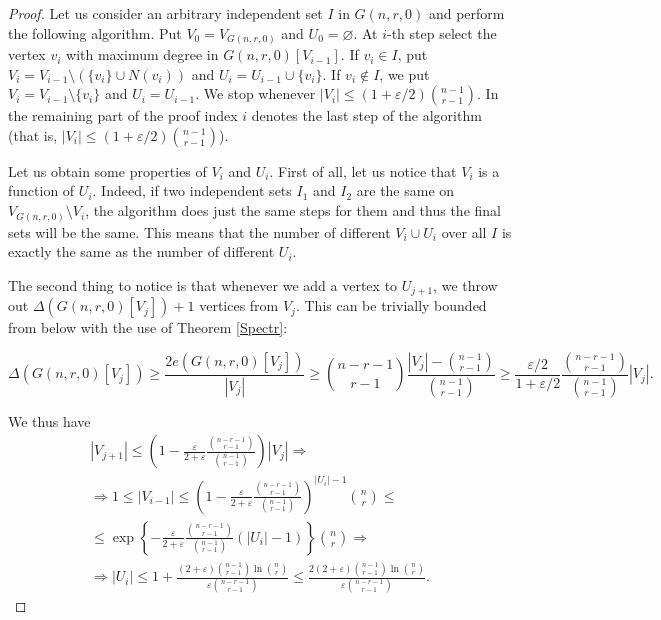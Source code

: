 \documentclass[12pt]{article}
\theoremstyle{remark}
\theoremstyle{definition}
\newcommand{\skob}[1]{\left(#1\right)}
\newcommand{\fig}[1]{\left\{#1\right\}}
\begin{document}
\begin{proof}
	Let us consider an arbitrary independent set $I$ in $G(n,r,0)$ and perform the following algorithm. Put $V_0 = V_{G(n,r,0)}$ and $U_0 = \varnothing$. At $i$-th step select the vertex $v_i$ with maximum degree in $G(n,r,0)[V_{i-1}]$. If $v_i \in I$, put $V_i = V_{i-1} \setminus (\{v_i\} \cup N(v_i))$ and $U_i = U_{i-1} \cup \{v_i\}$. If $v_i \notin I$, we put $V_i = V_{i-1} \setminus \{v_i\}$ and $U_i = U_{i-1}$. We stop whenever $|V_i| \leq (1+\varepsilon/2)\binom{n-1}{r-1}$. In the remaining part of the proof index $i$ denotes the last step of the algorithm (that is, $|V_i| \leq (1+\varepsilon/2)\binom{n-1}{r-1}$).
	
	Let us obtain some properties of $V_i$ and $U_i$. First of all, let us notice that $V_i$ is a function of $U_i$. Indeed, if two independent sets $I_1$ and $I_2$ are the same on $V_{G(n,r,0)} \setminus V_i$, the algorithm does just the same steps for them and thus the final sets will be the same. This means that the number of different $V_i \cup U_i$ over all $I$ is exactly the same as the number of different $U_i$. 
	
	The second thing to notice is that whenever we add a vertex to $U_{j+1}$, we throw out $\Delta(G(n,r,0)[V_j])+1$ vertices from $V_j$. This can be trivially bounded from below with the use of Theorem \ref{Spectr}: 
	
	$$
		\Delta(G(n,r,0)[V_j]) \geq \frac{2e(G(n,r,0)[V_j])}{|V_j|} \geq \binom{n-r-1}{r-1}\frac{|V_j| - \binom{n-1}{r-1}}{\binom{n-1}{r-1}} \geq \frac{\varepsilon / 2}{1 + \varepsilon / 2}\frac{\binom{n-r-1}{r-1}}{\binom{n-1}{r-1}}|V_j|.
	$$
	
	We thus have 
	\begin{multline*}
		|V_{j+1}| \leq \skob{1-\frac{\varepsilon}{2 + \varepsilon}\frac{\binom{n-r-1}{r-1}}{\binom{n-1}{r-1}}}|V_j| \Rightarrow \\ 
		\Rightarrow 1 \leq |V_{i-1}| \leq \skob{1-\frac{\varepsilon}{2 + \varepsilon}\frac{\binom{n-r-1}{r-1}}{\binom{n-1}{r-1}}}^{|U_i|-1}\binom{n}{r} \leq \\ 
		\leq  \exp\fig{-\frac{\varepsilon}{2 + \varepsilon}\frac{\binom{n-r-1}{r-1}}{\binom{n-1}{r-1}}(|U_i|-1)}\binom{n}{r} \Rightarrow \\
		\Rightarrow |U_i| \leq 1 + \frac{(2+\varepsilon)\binom{n-1}{r-1}\ln \binom{n}{r}}{\varepsilon\binom{n-r-1}{r-1}} \leq \frac{2(2+\varepsilon)\binom{n-1}{r-1}\ln \binom{n}{r}}{\varepsilon\binom{n-r-1}{r-1}}.
	\end{multline*}
	    

\end{proof}
\end{document}
